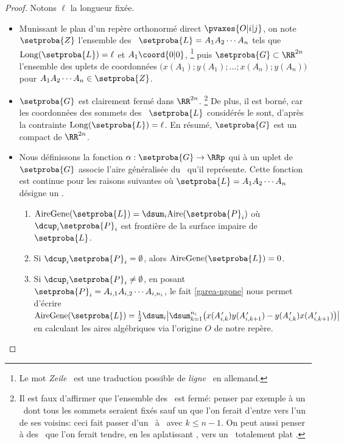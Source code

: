 \begin{proof}
	Notons $\ell$ la longueur fixée.
    \begin{itemize}
        \item Munissant le plan d'un repère orthonormé direct $\pvaxes{O | i | j}$, on note $\setproba{Z}$ l'ensemble des \ncycles\ $\setproba{L} = A_1 A_2 \cdots A_n$ tels que
        $\perim{\setproba{L}} = \ell$
        et
        $A_1\coord{0 | 0}$,%
        \footnote{
        	Le mot \og \emph{Zeile} \fg\ est une traduction possible de \og \emph{ligne} \fg\ en allemand.
        }
        puis $\setproba{G} \subset \RR^{2n}$ l'ensemble des uplets de coordonnées $\big( x(A_1) ; y(A_1) ; \dots ; x(A_n) ; y(A_n) \big)$ pour $A_1 A_2 \cdots A_n \in \setproba{Z}$.


        \item $\setproba{G}$ est clairement fermé dans $\RR^{2n}$.%
        \footnote{
        	Il est faux d'affirmer que l'ensemble des \ngones\ est fermé: penser par exemple à un \ngone\ dont tous les sommets seraient fixés sauf un que l'on ferait d'entre vers l'un de ses voisins: ceci fait passer d'un \ngone\ à \kgone\ avec $k \leq n-1$.
	        On peut aussi penser à des \ngones\ que l'on ferait tendre, en les \og aplatissant \fg, vers un \ncycle\ totalement \og plat \fg.
        }
        De plus, il est borné, car les coordonnées des sommets des \ncycles\ $\setproba{L}$ considérés le sont, d'après la contrainte $\perim{\setproba{L}} = \ell$.
        En résumé, $\setproba{G}$ est un compact de $\RR^{2n}$.


        \item Nous définissons la fonction $\alpha: \setproba{G} \rightarrow \RRp$ qui à un uplet de $\setproba{G}$ associe l'aire généralisée du \ncycle\ qu'il représente.
        Cette fonction est continue pour les raisons suivantes où $\setproba{L} = A_1 A_2 \cdots A_n$ désigne un \ncycle.
        \begin{enumerate}
        	\item $\garea{\setproba{L}} = \dsum_{i} \area{\setproba{P}_i}$ où $\dcup_{i} \setproba{P}_i$ est frontière de la surface impaire de $\setproba{L}$.


			\item Si $\dcup_{i} \setproba{P}_i = \emptyset$, alors $\garea{\setproba{L}} = 0$.


			\item Si $\dcup_{i} \setproba{P}_i \neq \emptyset$, 
			en posant $\setproba{P}_i = A_{i,1} A_{i,2} \cdots A_{i,n_i}$, 
			le fait \ref{garea-ngone} nous permet d'écrire
			$ \garea{\setproba{L}} 
			= \frac12 \dsum_{i} \big\lvert
				\dsum_{k=1}^{n_i} \big( 
					  x(A^{\,\prime}_{i,k}) y(A^{\,\prime}_{i,k+1}) 
					- y(A^{\,\prime}_{i,k}) x(A^{\,\prime}_{i,k+1})
				\big)
			 \big\rvert$
			en calculant les aires algébriques via l'origine $O$ de notre repère.


\end{enumerate}
\end{itemize}
\end{proof}
